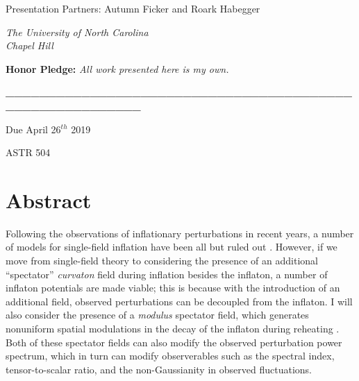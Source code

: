 \documentclass[12pt]{article}
\begin{document}
\begin{titlepage}
		Presentation Partners: Autumn Ficker and Roark Habegger
		
		\vspace{0.75\baselineskip}
		
		\textit{The University of North Carolina \\ Chapel Hill} %
		
		\vspace{0.75\baselineskip}
		
		\textbf{Honor Pledge:}
		\textit{All work presented here is my own.}
		
		\vspace{3\baselineskip}
			
		\textbf{\_\_\_\_\_\_\_\_\_\_\_\_\_\_\_\_\_\_\_\_\_\_\_\_\_\_\_\_\_\_\_\_\_\_\_\_\_\_\_\_\_\_\_\_\_\_\_\_\_\_\_\_\_\_\_\_\_}
        
\vspace{2\baselineskip}

		
		\vfill %
		
		
		
		\vspace{0.3\baselineskip} %
		
		Due April 26$^{th}$ 2019 %
		
		{\large ASTR 504} %
		
	\end{titlepage}

\section*{Abstract}
\par Following the observations of inflationary perturbations in recent years, a number of models for single-field inflation have been all but ruled out \cite{curvaton}. However, if we move from single-field theory to considering the presence of an additional ``spectator'' \textit{curvaton} field during inflation besides the inflaton, a number of inflaton potentials are made viable; this is because with the introduction of an additional field, observed perturbations can be decoupled from the inflaton. I will also consider the presence of a \textit{modulus} spectator field, which generates nonuniform spatial modulations in the decay of the inflaton during reheating \cite{modul}. Both of these spectator fields can also modify the observed perturbation power spectrum, which in turn can modify observerables such as the spectral index, tensor-to-scalar ratio, and the non-Gaussianity in observed fluctuations.
\end{document}
